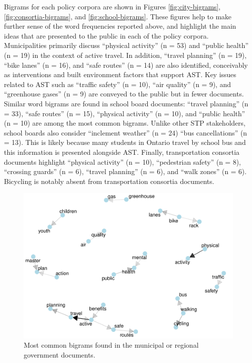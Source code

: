 \documentclass[]{elsarticle} %
\begin{document}
Bigrams for each policy corpora are shown in Figures
\ref{fig:city-bigrams}, \ref{fig:consortia-bigrams}, and
\ref{fig:school-bigrams}. These figures help to make further sense of
the word frequencies reported above, and highlight the main ideas that
are presented to the public in each of the policy corpora.
Municipalities primarily discuss ``physical activity'' (n = 53) and
``public health'' (n = 19) in the context of active travel. In addition,
``travel planning'' (n = 19), ``bike lanes'' (n = 16), and ``safe
routes'' (n = 14) are also identified, conceivably as interventions and
built environment factors that support AST. Key issues related to AST
such as ``traffic safety'' (n = 10), ``air quality'' (n = 9), and
``greenhouse gases'' (n = 9) are conveyed to the public but in fewer
documents. Similar word bigrams are found in school board documents:
``travel planning'' (n = 33), ``safe routes'' (n = 15), ``physical
activity'' (n = 10), and ``public health'' (n = 10) are among the most
common bigrams. Unlike other STP stakeholders, school boards also
consider ``inclement weather'' (n = 24) ``bus cancellations'' (n = 13).
This is likely because many students in Ontario travel by school bus and
this information is presented alongside AST. Finally, transportation
consortia documents highlight ``physical activity'' (n = 10),
``pedestrian safety'' (n = 8), ``crossing guards'' (n = 6), ``travel
planning'' (n = 6), and ``walk zones'' (n = 6). Bicycling is notably
absent from transportation consortia documents.

\begin{figure}

{\centering \includegraphics[width=1\linewidth]{AST-Framing-Ontario_files/figure-latex/city-visual-1} 

}

\caption{Most common bigrams found in the municipal or regional government documents.}\label{fig:city-visual}
\end{figure}
\end{document}
